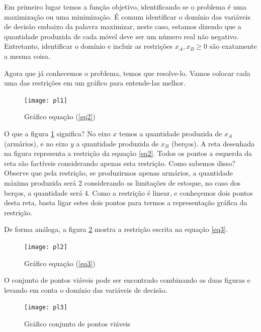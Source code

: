 Em primeiro lugar temos a função objetivo, identificando se o problema é uma maximização ou uma minimização. É comum identificar o domínio das variáveis de decisão embaixo da palavra maximizar, neste caso, estamos dizendo que a quantidade produzida de cada móvel deve ser um número real não negativo. Entretanto, identificar o domínio e incluir as restrições $x_A, x_B \geq 0$ são exatamente a mesma coisa. 

Agora que já conhecemos o problema, temos que resolve-lo. Vamos colocar cada uma das restrições em um gráfico para entende-las melhor. 

\begin{figure}[H]
\begin{centering}
\texttt{[image: pl1]}\protect\caption{\label{fig:pl1}Gráfico equação (\ref{eq2})}
\end{centering}

\end{figure}

O que a figura \ref{fig:pl1} significa? No eixo $x$ temos a quantidade produzida de $x_A$ (armários), e no eixo $y$ a quantidade produzida de $x_B$ (berços). A reta desenhada na figura representa a restrição da equação \ref{eq2}. Todos os pontos a esquerda da reta são factíveis considerando apenas esta restrição. Como sabemos disso? Observe que pela restrição, se produzirmos apenas armários, a quantidade máxima produzida será 2 considerando as limitações de estoque, no caso dos berços, a quantidade será 4. Como a restrição é linear, e conheçemos dois pontos desta reta, basta ligar estes dois pontos para termos a representação gráfica da restrição.

De forma análoga, a figura \ref{fig:pl2} mostra a restrição escrita na equação \ref{eq3}.

\begin{figure}[H]
\begin{centering}
\texttt{[image: pl2]}\protect\caption{\label{fig:pl2}Gráfico equação (\ref{eq3})}
\end{centering}

\end{figure}

O conjunto de pontos viáveis pode ser encontrado combinando as duas figuras e levando em conta o domínio das variáveis de decisão. 

\begin{figure}[H]
\begin{centering}
\texttt{[image: pl3]}\protect\caption{\label{fig:pl3}Gráfico conjunto de pontos viáveis}
\end{centering}

\end{figure}

